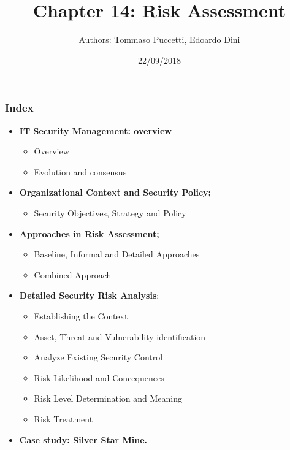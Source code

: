 \documentclass[xcolor ={table,usenames,dvipsnames}]{beamer}
\title{Chapter 14: Risk Assessment}
\author{Authors: Tommaso Puccetti, Edoardo Dini}
\institute{Universit\`a  degli studi di Firenze}
\date{22/09/2018}
\theoremstyle{definition}
\begin{document}
	
	\begin{frame}
		\maketitle
	\end{frame}
	
		\begin{frame}
		\frametitle{Index}
		\begin{itemize}
			\item  \textbf{IT Security Management: overview}
			\begin{itemize}
				\item Overview
				\item Evolution and consensus
			\end{itemize}
			\item   \textbf{Organizational Context and Security Policy;}
			\begin{itemize}
				\item Security Objectives, Strategy and Policy
			\end{itemize}
			\item   \textbf{Approaches in Risk Assessment;}
			\begin{itemize}
				\item Baseline, Informal and Detailed Approaches
				\item Combined Approach
			\end{itemize}
			\item  \textbf{Detailed Security Risk Analysis};
			\begin{itemize}
				\item Establishing the Context
				\item Asset, Threat and Vulnerability identification
				\item Analyze Existing Security Control
				\item Risk Likelihood and Concequences
				\item Risk Level Determination and Meaning
				\item Risk Treatment
			\end{itemize}
			\item  \textbf{Case study: Silver Star Mine.}
		\end{itemize}
	\end{frame}
		
\end{document}

